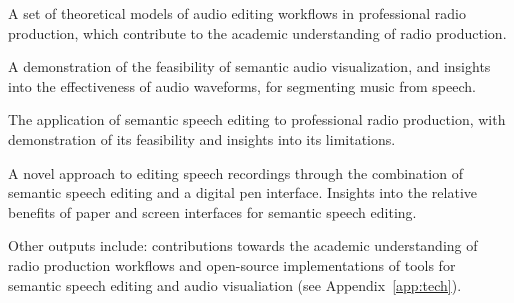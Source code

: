 




  A set of theoretical models of audio editing workflows in professional radio production, which
  contribute to the academic understanding of radio production.

  A demonstration of the feasibility of semantic audio visualization, and insights into the
  effectiveness of audio waveforms, for segmenting music from speech.

  The application of semantic speech editing to professional radio production, with
  demonstration of its feasibility and insights into its limitations. 

  A novel approach to editing speech recordings through the combination of semantic speech
  editing and a digital pen interface. Insights into the relative benefits of paper and screen interfaces for semantic
  speech editing.

  Other outputs include: contributions towards the academic understanding of radio production workflows
  and open-source implementations of tools for semantic speech editing and audio visualiation (see
  Appendix~\ref{app:tech}).




